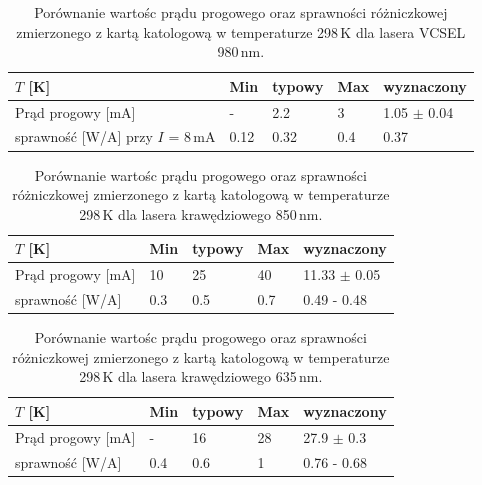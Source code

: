 \begin{table}[h!]
\begin{center}
\label{tab:tabela2}
\caption{Porównanie wartośc prądu progowego oraz sprawności różniczkowej zmierzonego z kartą katologową
 w temperaturze 298\,K dla lasera VCSEL 980\,nm. }
\begin{tabular}{ | C{3.5cm}|  C{1.5cm} | C{1.5cm} | C{1.5cm}| C{3.5cm}|}
\hline
$T$ [K]           &   Min  & typowy & Max   & wyznaczony        \\ \hline
Prąd progowy [mA] &  -    &  2.2    & 3    & 1.05 $\pm$ 0.04  \\ \hline
sprawność [W/A]  przy $I$ = 8\,mA   &  0.12   &  0.32   & 0.4   & 0.37      \\ \hline
\end{tabular}
\end{center}
\end{table}

\begin{table}[h!]
\begin{center}
\label{tab:tabela3}
\caption{Porównanie wartośc prądu progowego oraz sprawności różniczkowej zmierzonego z kartą katologową
 w temperaturze 298\,K dla lasera krawędziowego 850\,nm. }
\begin{tabular}{ | C{3.5cm}|  C{1.5cm} | C{1.5cm} | C{1.5cm}| C{3.5cm}|}
\hline
$T$ [K]           &   Min  & typowy & Max   & wyznaczony        \\ \hline
Prąd progowy [mA] &  10    &  25    & 40    & 11.33 $\pm$ 0.05  \\ \hline
sprawność [W/A]     &  0.3   &  0.5   & 0.7   & 0.49 - 0.48       \\ \hline
\end{tabular}
\end{center}
\end{table}

\begin{table}[h!]
\begin{center}
\label{tab:tabela4}
\caption{Porównanie wartośc prądu progowego oraz sprawności różniczkowej zmierzonego z kartą katologową
 w temperaturze 298\,K dla lasera krawędziowego 635\,nm. }
\begin{tabular}{ | C{3.5cm}|  C{1.5cm} | C{1.5cm} | C{1.5cm}| C{3.5cm}|}
\hline
$T$ [K]           &   Min  & typowy & Max   & wyznaczony        \\ \hline
Prąd progowy [mA] &  -    &  16    & 28    & 27.9 $\pm$ 0.3  \\ \hline
sprawność [W/A]      &  0.4   &  0.6   & 1  & 0.76 - 0.68       \\ \hline
\end{tabular}
\end{center}
\end{table}
